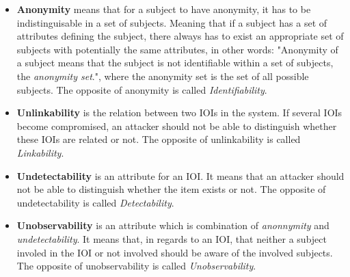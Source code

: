 


\begin{itemize}
\item[] \textbf{Anonymity} means that for a subject to have anonymity, it has to be indistinguisable in a set of subjects. Meaning that if a subject has a set of attributes defining the subject, there always has to exist an appropriate set of subjects with potentially the same attributes, in other words: "Anonymity of a subject means that the subject is not identifiable within a set of subjects, the \textit{anonymity set}.", where the anonymity set is the set of all possible subjects. The opposite of anonymity is called \textit{Identifiability}. %

\item[] \textbf{Unlinkability} is the relation between two IOIs in the system. If several IOIs become compromised, an attacker should not be able to distinguish whether these IOIs are related or not. The opposite of unlinkability is called \textit{Linkability}.

\item[] \textbf{Undetectability} is an attribute for an IOI. It means that an attacker should not be able to distinguish whether the item exists or not. The opposite of undetectability is called \textit{Detectability}.

\item[] \textbf{Unobservability} is an attribute which is combination of \textit{anonnymity} and \textit{undetectability}. It means that, in regards to an IOI, that neither a subject involed in the IOI or not involved should be aware of the involved subjects. The opposite of unobservability is called \textit{Unobservability}.
\end{itemize}


